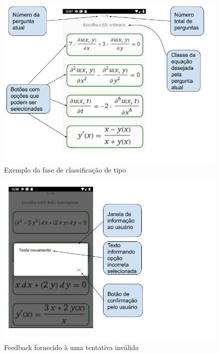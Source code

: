 \begin{figure}[H]
\centering
\caption{Exemplo da fase de classificação de tipo}
\includegraphics[scale=0.72]{figuras/ex_ed_ordinaria.png}
\end{figure}

\begin{figure}[H]
\centering
\caption{Feedback fornecido à uma tentativa inválida}
\includegraphics[scale=0.72]{figuras/tente_novamente.png}
\end{figure}


